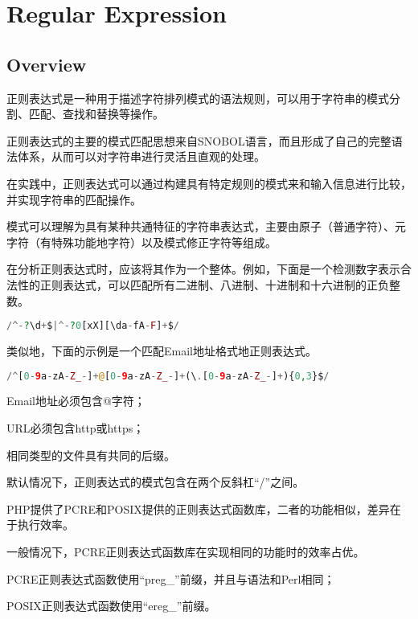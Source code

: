 \part{Regular Expression}


\chapter{Overview}


正则表达式是一种用于描述字符排列模式的语法规则，可以用于字符串的模式分割、匹配、查找和替换等操作。

正则表达式的主要的模式匹配思想来自SNOBOL语言，而且形成了自己的完整语法体系，从而可以对字符串进行灵活且直观的处理。

在实践中，正则表达式可以通过构建具有特定规则的模式来和输入信息进行比较，并实现字符串的匹配操作。

模式可以理解为具有某种共通特征的字符串表达式，主要由原子（普通字符）、元字符（有特殊功能地字符）以及模式修正字符等组成。

在分析正则表达式时，应该将其作为一个整体。例如，下面是一个检测数字表示合法性的正则表达式，可以匹配所有二进制、八进制、十进制和十六进制的正负整数。

\begin{lstlisting}[language=PHP]
/^-?\d+$|^-?0[xX][\da-fA-F]+$/
\end{lstlisting}

类似地，下面的示例是一个匹配Email地址格式地正则表达式。

\begin{lstlisting}[language=PHP]
/^[0-9a-zA-Z_-]+@[0-9a-zA-Z_-]+(\.[0-9a-zA-Z_-]+){0,3}$/
\end{lstlisting}

\begin{compactitem}
\item Email地址必须包含@字符；
\item URL必须包含http或https；
\item 相同类型的文件具有共同的后缀。
\end{compactitem}

默认情况下，正则表达式的模式包含在两个反斜杠“/”之间。

PHP提供了PCRE和POSIX提供的正则表达式函数库，二者的功能相似，差异在于执行效率。

一般情况下，PCRE正则表达式函数库在实现相同的功能时的效率占优。

\begin{compactitem}
\item PCRE正则表达式函数使用“preg\_”前缀，并且与语法和Perl相同；
\item POSIX正则表达式函数使用“ereg\_”前缀。
\end{compactitem}

